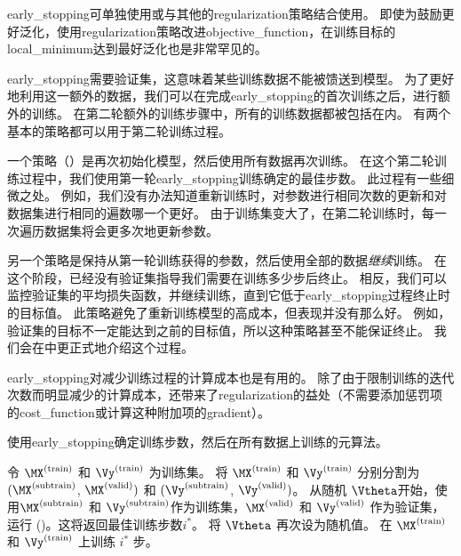 \gls{early_stopping}可单独使用或与其他的\gls{regularization}策略结合使用。
即使为鼓励更好泛化，使用\gls{regularization}策略改进\gls{objective_function}，在训练目标的\gls{local_minimum}达到最好泛化也是非常罕见的。

\gls{early_stopping}需要验证集，这意味着某些训练数据不能被馈送到模型。
为了更好地利用这一额外的数据，我们可以在完成\gls{early_stopping}的首次训练之后，进行额外的训练。
在第二轮额外的训练步骤中，所有的训练数据都被包括在内。
有两个基本的策略都可以用于第二轮训练过程。


一个策略（）是再次初始化模型，然后使用所有数据再次训练。
在这个第二轮训练过程中，我们使用第一轮\gls{early_stopping}训练确定的最佳步数。
此过程有一些细微之处。
例如，我们没有办法知道重新训练时，对参数进行相同次数的更新和对数据集进行相同的遍数哪一个更好。
由于训练集变大了，在第二轮训练时，每一次遍历数据集将会更多次地更新参数。

另一个策略是保持从第一轮训练获得的参数，然后使用全部的数据\emph{继续}训练。
在这个阶段，已经没有验证集指导我们需要在训练多少步后终止。
相反，我们可以监控验证集的平均损失函数，并继续训练，直到它低于\gls{early_stopping}过程终止时的目标值。
此策略避免了重新训练模型的高成本，但表现并没有那么好。
例如，验证集的目标不一定能达到之前的目标值，所以这种策略甚至不能保证终止。
我们会在中更正式地介绍这个过程。

\gls{early_stopping}对减少训练过程的计算成本也是有用的。
除了由于限制训练的迭代次数而明显减少的计算成本，还带来了\gls{regularization}的益处（不需要添加惩罚项的\gls{cost_function}或计算这种附加项的\gls{gradient}）。

\begin{algorithm}[ht]
\caption{使用\gls{early_stopping}确定训练步数，然后在所有数据上训练的元算法。
}
\label{alg:early_stopping_retrain}
\begin{algorithmic}
\STATE 令 $\MX^{(\text{train})}$ 和 $\Vy^{(\text{train})}$ 为训练集。
\STATE 将 $\MX^{(\text{train})}$ 和 $\Vy^{(\text{train})}$ 分别分割为 $(\MX^{(\text{subtrain})}$, $\MX^{(\text{valid})})$ 和 $(\Vy^{(\text{subtrain})}$, $\Vy^{(\text{valid})})$。
\STATE 从随机 $\Vtheta$开始，使用$\MX^{(\text{subtrain})}$ 和 $\Vy^{(\text{subtrain})}$作为训练集，$\MX^{(\text{valid})}$ 和 $\Vy^{(\text{valid})}$ 作为验证集，运行 ()。这将返回最佳训练步数$i^*$。
\STATE 将 $\Vtheta$ 再次设为随机值。
\STATE 在 $\MX^{(\text{train})}$ 和 $\Vy^{(\text{train})}$ 上训练 $i^*$ 步。  
\end{algorithmic}
\end{algorithm}

